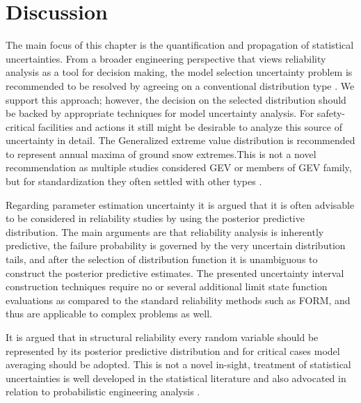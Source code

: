 \section{Discussion}

The main focus of this chapter is the quantification and propagation of statistical uncertainties. From a broader engineering perspective that views reliability analysis as a tool for decision making, the model selection uncertainty problem is recommended to be resolved by agreeing on a conventional distribution type \citep{Melchers2002, Ditlevsen1994}. We support this approach; however, the decision on the selected distribution should be backed by appropriate techniques for model uncertainty analysis. For safety-critical facilities and actions it still might be desirable to analyze this source of uncertainty in detail. The Generalized extreme value distribution is recommended to represent annual maxima of ground snow extremes.This is not a novel recommendation as multiple studies considered GEV or members of GEV family, but for standardization they often settled with other types \citep{Sanpaolesi1998, Ellingwood1984}.

Regarding parameter estimation uncertainty it is argued that it is often advisable to be considered in reliability studies by using the posterior predictive distribution. The main arguments are that reliability analysis is inherently predictive, the failure probability is governed by the very uncertain distribution tails, and after the selection of distribution function it is unambiguous to construct the posterior predictive estimates.
The presented uncertainty interval construction techniques require no or several additional limit state function evaluations as compared to the standard reliability methods such as FORM, and thus are applicable to complex problems as well.

It is argued that in structural reliability every random variable should be represented by its posterior  predictive distribution and for critical cases model averaging should be adopted. This is not a novel in-sight, treatment of statistical uncertainties is well developed in the statistical literature \citep{Wit2012, Aitchison1980} and also advocated in relation to probabilistic engineering analysis \citep{Kiureghian2008, Coles2003fully_prob, Gelder2000}.

